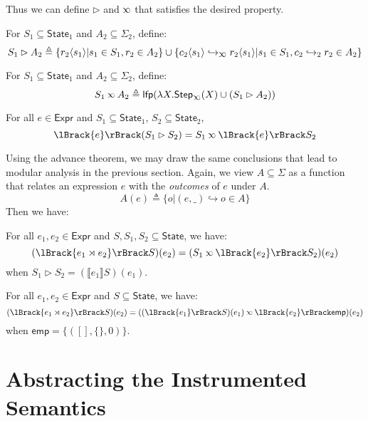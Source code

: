 \documentclass[acmsmall,screen,review]{acmart}\settopmatter{printfolios=true,printccs=false,printacmref=false}
\theoremstyle{acmdefinition}
\newcommand*{\Expr}{\mathsf{Expr}}
\newcommand*{\config}{c}
\newcommand*{\rightst}{r}
\newcommand*{\State}{\mathsf{State}}
\newcommand*{\lfp}{\mathsf{lfp}}
\newcommand*{\Step}{\mathsf{Step}}
\newcommand*{\semarrow}{\hookrightarrow}
\newcommand*{\semlink}{\mathbin{\rotatebox[origin=c]{180}{$\propto$}}}
\newcommand*{\link}[2]{{#1}\rtimes{#2}}
\newcommand*{\mt}{\mathsf{emp}}
\newcommand*{\sembracket}[1]{\lBrack{#1}\rBrack}
\newcommand*{\inject}[2]{{#2}\langle{#1}\rangle}
\begin{document}
Thus we can define $\rhd$ and $\semlink$ that satisfies the desired property.
\begin{definition}[Injection]
  For $S_1\subseteq\State_1$ and $A_2\subseteq\Sigma_2$, define:
  \[
    S_1\rhd A_2\triangleq\{\inject{s_1}{\rightst_2}|s_1\in S_1,\rightst_2\in A_2\}\cup\{\inject{s_1}{\config_2}\semarrow_{\semlink}\inject{s_1}{\rightst_2}|s_1\in S_1,\config_2\semarrow_2\rightst_2\in A_2\}
  \]
\end{definition}
\begin{definition}
  For $S_1\subseteq\State_1$ and $A_2\subseteq\Sigma_2$, define:
  \[
    S_1\semlink A_2\triangleq\lfp(\lambda X.\Step_{\semlink}(X)\cup(S_1\rhd A_2))
  \]
\end{definition}
\begin{theorem}[Advance]
  For all $e\in\Expr$ and $S_1\subseteq\State_1$, $S_2\subseteq\State_2$,
  \[
    \sembracket{e}(S_1\rhd S_2)=S_1\semlink\sembracket{e}S_2
  \]
\end{theorem}
Using the advance theorem, we may draw the same conclusions that lead to modular analysis in the previous section.
Again, we view $A\subseteq\Sigma$ as a function that relates an expression $e$ with the \emph{outcomes} of $e$ under $A$.
\[A(e)\triangleq\{o|(e,\_)\semarrow o\in A\}\]
Then we have:
\begin{corollary} For all $e_1,e_2\in\Expr$ and $S,S_1,S_2\subseteq\State$, we have:
  \[(\sembracket{\link{e_1}{e_2}}S)(e_2)=(S_1\semlink\sembracket{e_2}S_2)(e_2)\]
  when $S_1\rhd S_2=(\sembracket{e_1}S)(e_1)$.
\end{corollary}
\begin{corollary} For all $e_1,e_2\in\Expr$ and $S\subseteq\State$, we have:
  \[(\sembracket{\link{e_1}{e_2}}S)(e_2)=((\sembracket{e_1}S)(e_1)\semlink\sembracket{e_2}\mt)(e_2)\]
  when $\mt=\{([],\{\},0)\}$.
\end{corollary}
\section{Abstracting the Instrumented Semantics}
\end{document}
